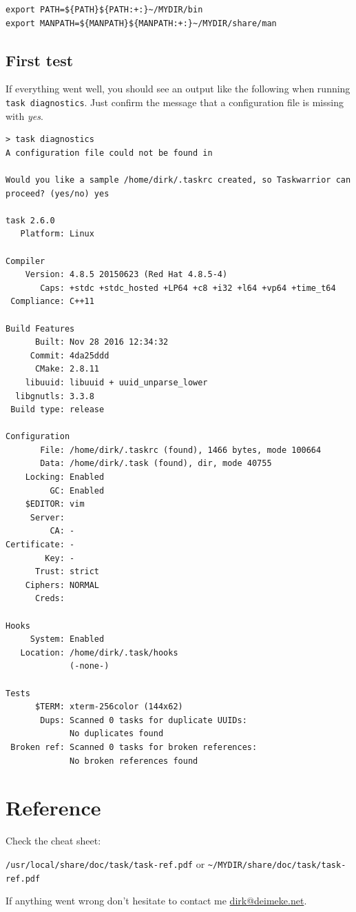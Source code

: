 \documentclass[DIV=12,fontsize=12pt,parskip=half,paper=portrait,%
               headheight=61pt,headinclude=yes,%
               footheight=15pt,footinclude=no]{scrartcl}
\begin{document}
\begin{lstlisting}
export PATH=${PATH}${PATH:+:}~/MYDIR/bin
export MANPATH=${MANPATH}${MANPATH:+:}~/MYDIR/share/man\end{lstlisting}

\subsection{First test}

If everything went well, you should see an output like the following when running \texttt{task diagnostics}. Just confirm the message that a configuration file is missing with \textit{yes}.

\begin{lstlisting}
> task diagnostics
A configuration file could not be found in

Would you like a sample /home/dirk/.taskrc created, so Taskwarrior can proceed? (yes/no) yes

task 2.6.0
   Platform: Linux

Compiler
    Version: 4.8.5 20150623 (Red Hat 4.8.5-4)
       Caps: +stdc +stdc_hosted +LP64 +c8 +i32 +l64 +vp64 +time_t64
 Compliance: C++11

Build Features
      Built: Nov 28 2016 12:34:32
     Commit: 4da25ddd
      CMake: 2.8.11
    libuuid: libuuid + uuid_unparse_lower
  libgnutls: 3.3.8
 Build type: release

Configuration
       File: /home/dirk/.taskrc (found), 1466 bytes, mode 100664
       Data: /home/dirk/.task (found), dir, mode 40755
    Locking: Enabled
         GC: Enabled
    $EDITOR: vim
     Server:
         CA: -
Certificate: -
        Key: -
      Trust: strict
    Ciphers: NORMAL
      Creds:

Hooks
     System: Enabled
   Location: /home/dirk/.task/hooks
             (-none-)

Tests
      $TERM: xterm-256color (144x62)
       Dups: Scanned 0 tasks for duplicate UUIDs:
             No duplicates found
 Broken ref: Scanned 0 tasks for broken references:
             No broken references found\end{lstlisting}

\section{Reference}

Check the cheat sheet:

\texttt{/usr/local/share/doc/task/task-ref.pdf} or \texttt{\textasciitilde/MYDIR/share/doc/task/task-ref.pdf}

If anything went wrong don't hesitate to contact me \href{mailto:dirk@deimeke.net}{dirk@deimeke.net}.
\end{document}
